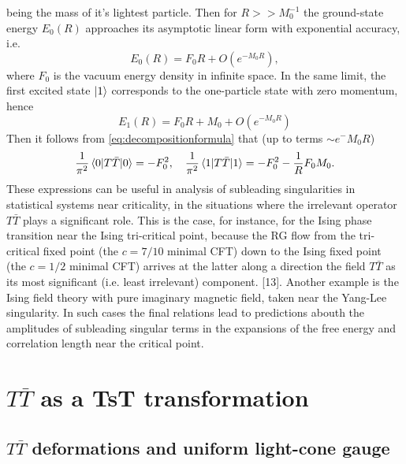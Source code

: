 being the mass of it's lightest particle. Then for $R>>M_0^{-1}$ the
ground-state energy $E_0(R)$ approaches its asymptotic linear form with
exponential accuracy, i.e.
\begin{equation}
  E_0(R) = F_0 R + O(e^{-M_0R}),
\end{equation}
where $F_0$ is the vacuum energy density in infinite space. In the same limit,
the first excited state $\ket{1}$ corresponds to the one-particle state with
zero momentum, hence
\begin{equation}
  E_1(R) = F_0 R + M_0 + O(e^{-M_0R})
\end{equation}
Then it follows from \eqref{eq:decompositionformula} that (up to terms $\sim
e^-M_0R$)
\begin{equation}
  \frac{1}{\pi^2}\mel{0}{T\bar{T}}{0} = - F^2_0,\quad
    \frac{1}{\pi^2}\mel{1}{T\bar{T}}{1} = -F^2_0 - \frac{1}{R}F_0M_0.
\end{equation}
These expressions can be useful in analysis of subleading singularities in
statistical systems near criticality, in the situations where the irrelevant
operator $T\bar{T}$ plays a significant role. This is the case, for instance, for
the Ising phase transition near the Ising tri-critical point, because the RG
flow from the tri-critical fixed point (the $c=7/10$ minimal CFT) down to the
Ising fixed point (the $c=1/2$ minimal CFT) arrives at the  latter along
a direction the field $T\bar{T}$ as its most significant (i.e. least
irrelevant) component. [13]. Another example is the Ising field theory with
pure imaginary magnetic field, taken near the Yang-Lee singularity. In such
cases the final relations lead to predictions abouth the amplitudes of
subleading singular terms in the expansions of the free energy and correlation
length near the critical point.
\section{$T\bar{T}$ as a TsT transformation}
\subsection{$T\bar{T}$ deformations and uniform light-cone gauge}
